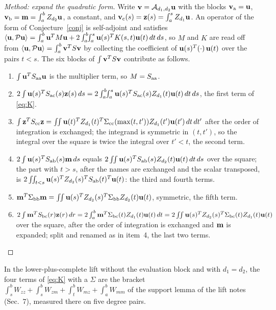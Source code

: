 \begin{proof}[Method: expand the quadratic form]
Write $\mathbf{v}=\mathcal{A}_{d_1,d_2}\mathbf{u}$ with the blocks $\mathbf{v}_{\mathrm{a}}=\mathbf{u}$, $\mathbf{v}_{\mathrm{b}}=\mathbf{m}=\int_a^bZ_{d_2}\mathbf{u}$, a constant, and $\mathbf{v}_{\mathrm{c}}(s)=\mathbf{z}(s)=\int_a^sZ_{d_1}\mathbf{u}$. An operator of the form of Conjecture~\ref{conj} is self-adjoint and satisfies $\left\langle \mathbf{u},\mathcal{P}\mathbf{u}\right\rangle=\int_a^b\mathbf{u}^TM\mathbf{u}+2\int_a^b\!\!\int_a^s\mathbf{u}(s)^TK(s,t)\mathbf{u}(t)\,dt\,ds$, so $M$ and $K$ are read off from $\left\langle \mathbf{u},\mathcal{P}\mathbf{u}\right\rangle=\int_a^b\mathbf{v}^TS\mathbf{v}$ by collecting the coefficient of $\mathbf{u}(s)^T(\cdot)\,\mathbf{u}(t)$ over the pairs $t<s$. The six blocks of $\int\mathbf{v}^TS\mathbf{v}$ contribute as follows.
\begin{enumerate}\setlength\itemsep{0pt}
\item $\int\mathbf{u}^TS_{\mathrm{a}\mathrm{a}}\mathbf{u}$ is the multiplier term, so $M=S_{\mathrm{a}\mathrm{a}}$.
\item $2\int\mathbf{u}(s)^TS_{\mathrm{a}\mathrm{c}}(s)\mathbf{z}(s)\,ds=2\int_a^b\!\!\int_a^s\mathbf{u}(s)^TS_{\mathrm{a}\mathrm{c}}(s)Z_{d_1}(t)\mathbf{u}(t)\,dt\,ds$, the first term of \eqref{eq:K}.
\item $\int\mathbf{z}^TS_{\mathrm{c}\mathrm{c}}\mathbf{z}=\int\!\!\int\mathbf{u}(t)^TZ_{d_1}(t)^T\Sigma_{\mathrm{c}\mathrm{c}}(\max(t,t'))Z_{d_1}(t')\mathbf{u}(t')\,dt\,dt'$ after the order of integration is exchanged; the integrand is symmetric in $(t,t')$, so the integral over the square is twice the integral over $t'<t$, the second term.
\item $2\int\mathbf{u}(s)^TS_{\mathrm{a}\mathrm{b}}(s)\mathbf{m}\,ds$ equals $2\int\!\!\int\mathbf{u}(s)^TS_{\mathrm{a}\mathrm{b}}(s)Z_{d_2}(t)\mathbf{u}(t)\,dt\,ds$ over the square; the part with $t>s$, after the names are exchanged and the scalar transposed, is $2\int\!\!\int_{t<s}\mathbf{u}(s)^TZ_{d_2}(s)^TS_{\mathrm{a}\mathrm{b}}(t)^T\mathbf{u}(t)$: the third and fourth terms.
\item $\mathbf{m}^T\Sigma_{\mathrm{b}\mathrm{b}}\mathbf{m}=\int\!\!\int\mathbf{u}(s)^TZ_{d_2}(s)^T\Sigma_{\mathrm{b}\mathrm{b}}Z_{d_2}(t)\mathbf{u}(t)$, symmetric, the fifth term.
\item $2\int\mathbf{m}^TS_{\mathrm{b}\mathrm{c}}(r)\mathbf{z}(r)\,dr=2\int_a^b\mathbf{m}^T\Sigma_{\mathrm{b}\mathrm{c}}(t)Z_{d_1}(t)\mathbf{u}(t)\,dt=2\int\!\!\int\mathbf{u}(s)^TZ_{d_2}(s)^T\Sigma_{\mathrm{b}\mathrm{c}}(t)Z_{d_1}(t)\mathbf{u}(t)$ over the square, after the order of integration is exchanged and $\mathbf{m}$ is expanded; split and renamed as in item~4, the last two terms. \qedhere
\end{enumerate}
\end{proof}

In the lower-plus-complete lift without the evaluation block and with $d_1=d_2$, the four terms of \eqref{eq:K} with a $\Sigma$ are the bracket $\int_s^bW_{zz}+\int_s^bW_{zm}+\int_t^bW_{mz}+\int_a^bW_{mm}$ of the support lemma of the lift notes (Sec.~7), measured there on five degree pairs.

